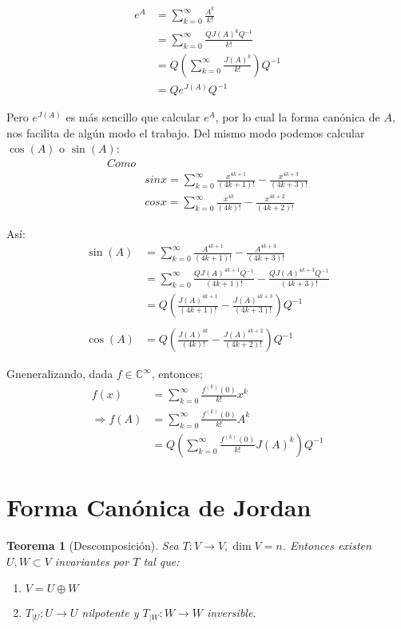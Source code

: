 \documentclass[10pt,a4paper]{article}
\newtheorem{mytheo}{Teorema}[section]
\begin{document}
\begin{align*}
e^{A} 	&= \sum_{k=0}^{\infty}\frac{A^{k}}{k!} \\
		&= \sum_{k=0}^{\infty}\frac{QJ(A)^{k}Q^{-1}}{k!}\\
		&= Q\left(\sum_{k=0}^{\infty}\frac{J(A)^{k}}{k!}\right)Q^{-1}\\
		& = Q e^{J(A)}Q^{-1}
\end{align*}

Pero $e^{J(A)}$ es más sencillo que calcular $e^{A}$, por lo cual la forma canónica de $A$, nos facilita de algún  modo el trabajo.
Del mismo modo podemos calcular $\cos (A)$ o $\sin (A)$:
\begin{align*}
	Como &\\
		& sin x = \sum_{k=0}^{\infty} \frac{x^{4k+1}}{(4k+1)!} - \frac{x^{4k+3}}{(4k+3)!}\\
		& cos x = \sum_{k=0}^{\infty} \frac{x^{4k}}{(4k)!} - \frac{x^{4k+2}}{(4k+2)!}
\end{align*}

Así:
\begin{align*}
	\sin (A) & = \sum_{k=0}^{\infty} \frac{A^{4k+1}}{(4k+1)!} - \frac{A^{4k+3}}{(4k+3)!}\\
			&= \sum_{k=0}^{\infty} \frac{QJ(A)^{4k+1}Q^{-1}}{(4k+1)!} - \frac{QJ(A)^{4k+3}Q^{-1}}{(4k+3)!}\\
			&= Q\left(\frac{J(A)^{4k+1}}{(4k+1)!} - \frac{J(A)^{4k+3}}{(4k+3)!}\right)Q^{-1}\\\\
	\cos (A) &= Q\left(\frac{J(A)^{4k}}{(4k)!} - \frac{J(A)^{4k+2}}{(4k+2)!}\right)Q^{-1}
\end{align*}

Gneneralizando, dada $f\in\mathbb{C}^{\infty}$, entonces;
\begin{align*}
	f(x) & = \sum_{k=0}^{\infty}\frac{f^{(k)}(0)}{k!}x^{k}\\
	\Rightarrow f(A) &= \sum_{k=0}^{\infty}\frac{f^{(k)}(0)}{k!}A^{k}\\
		&= Q\left(\sum_{k=0}^{\infty}\frac{f^{(k)}(0)}{k!}J(A)^{k}\right)Q^{-1}
\end{align*}

\section{Forma Canónica de Jordan}

\begin{mytheo}[Descomposición]
Sea $T:V\rightarrow V, \dim V = n$. Entonces existen $U, W\subset V$ invariantes por $T$ tal que:
\begin{enumerate}
	\item $V = U\oplus W$
	\item $T_{|U}: U\rightarrow U$ nilpotente y $T_{|W}: W\rightarrow W$ inversible.
\end{enumerate}
\end{mytheo}
\end{document}

